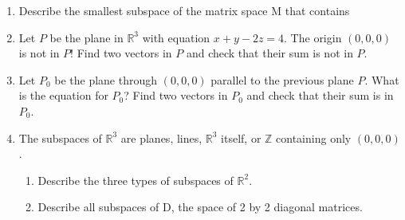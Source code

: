 \documentclass[14pt, a4paper]{article}
\begin{document}
\begin{enumerate}
    \item Describe the smallest subspace of the matrix space M that contains
          \begin{enumerate}

          \end{enumerate}

    \item Let $P$ be the plane in $\mathbb{R}^3$ with equation $x+y-2z=4$. The origin $(0,0,0)$ is not in $P$! Find two vectors in $P$ and check that their sum is not in $P$.

    \item Let $P_0$ be the plane through $(0,0,0)$ parallel to the previous plane $P$. What is the equation for $P_0$? Find two vectors in $P_0$ and check that their sum is in $P_0$.

    \item The subspaces of $\mathbb{R}^3$ are planes, lines, $\mathbb{R}^3$ itself, or $\mathbb{Z}$ containing only $(0,0,0)$.
          \begin{enumerate}
              \item Describe the three types of subspaces of $\mathbb{R}^2$.
              \item Describe all subspaces of D, the space of 2 by 2 diagonal matrices.
          \end{enumerate}


\end{enumerate}
\end{document}
